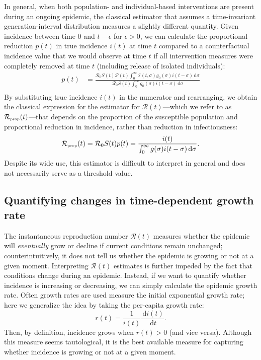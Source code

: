 \documentclass[12pt]{article}
\newcommand{\Rx}[1]{\ensuremath{{\mathcal R}_{#1}}\xspace}
\newcommand{\Ro}{\Rx{0}}
\newcommand{\RR}{\ensuremath{{\mathcal R}}\xspace}
\newcommand{\tsub}[2]{#1_{{\textrm{\tiny #2}}}}
\newcommand{\dd}[1]{\ensuremath{\, \mathrm{d}#1}}
\newcommand{\dsigma}{\dd{\sigma}}
\newcommand{\PP}{{\mathcal P}}
\newcommand{\II}{{\mathcal I}}
\begin{document}
In general, when both population- and individual-based interventions are present during an ongoing epidemic, the classical estimator that assumes a time-invariant generation-interval distribution measures a slightly different quantity.
Given incidence between time $0$ and $t-\epsilon$ for $\epsilon > 0$, we can calculate the proportional reduction $p(t)$ in true incidence $i(t)$ at time $t$ compared to a counterfactual incidence value that we would observe at time $t$ if all intervention measures were completely removed at time $t$ (including release of isolated individuals):
\begin{align}
p(t) &= \frac{\Ro S(t) \PP(t) \int_0^\infty \II(t, \sigma) g_0(\sigma) i(t-\sigma)\dsigma}{\Ro S(t) \int_0^\infty g_0(\sigma) i(t-\sigma) \dsigma}\\
\end{align}
By substituting true incidence $i(t)$ in the numerator and rearranging, we obtain the classical expression for the estimator for $\RR(t)$---which we refer to as $\tsub{\RR}{prop}(t)$---that depends on the proportion of the susceptible population and proportional reduction in incidence, rather than reduction in infectiousness:
\begin{equation}
\tsub{\RR}{prop}(t) = \Ro S(t) p(t) = \frac{i(t)}{\int_0^\infty g(\sigma) i(t-\sigma) \dsigma}.
\end{equation}
Despite its wide use, this estimator is difficult to interpret in general and does not necessarily serve as a threshold value.

\subsection{Quantifying changes in time-dependent growth rate}

The instantaneous reproduction number $\RR(t)$ measures whether the epidemic will \emph{eventually} grow or decline if current conditions remain unchanged;
counterintuitively, it does not tell us whether the epidemic is growing or not at a given moment.
Interpreting $\RR(t)$ estimates is further impeded by the fact that conditions change during an epidemic.
Instead, if we want to quantify whether incidence is increasing or decreasing, we can simply calculate the epidemic growth rate.
Often growth rates are used measure the initial exponential growth rate; here we generalize the idea by taking the per-capita growth rate:
\begin{equation}
r(t) = \frac{1}{i(t)} \frac{\dd{i(t)}}{\dd{t}}.
\end{equation}
Then, by definition, incidence grows when $r(t) > 0$ (and vice versa).
Although this measure seems tautological, it is the best available measure for capturing whether incidence is growing or not at a given moment.
\end{document}
